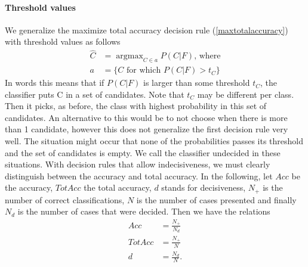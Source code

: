 \documentclass{report}
\DeclareMathOperator*{\argmax}{argmax}
\theoremstyle{definition}
\begin{document}
\paragraph*{Threshold values}
We generalize the maximize total accuracy decision rule (\ref{maxtotalaccuracy}) with threshold values as follows
\begin{align} \label{tresholds}
\hat{C}&=\argmax_{C \in a} P(C|F)\text{, where}\\
a &= \{C \text{ for which } P(C|F)>t_C \} 
\end{align}
In words this means that if $P(C|F)$ is larger than some threshold $t_C$, the classifier puts C in a set of candidates. Note that $t_C$ may be different per class. Then it picks, as before, the class with highest probability in this set of candidates. An alternative to this would be to not choose when there is more than 1 candidate, however this does not generalize the first decision rule very well. The situation might occur that none of the probabilities passes its threshold and the set of candidates is empty. We call the classifier undecided in these situations. With decision rules that allow indecisiveness, we must clearly distinguish between the accuracy and total accuracy. In the following, let $Acc$ be the accuracy, $TotAcc$ the total accuracy, $d$ stands for decisiveness, $N_+$ is the number of correct classifications, $N$ is the number of cases presented and finally $N_d$ is the number of cases that were decided. Then we have the relations
\begin{equation} \label{tresholdnotations}
\begin{split}
Acc &= \frac{N_+}{N_d}\\
TotAcc &=\frac{N_+}{N}\\
d &= \frac{N_d}{N}.
\end{split}
\end{equation} 
\end{document}

